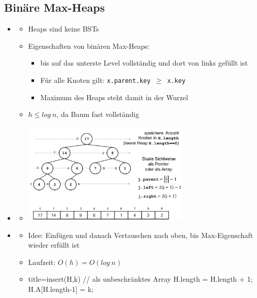 \documentclass[
    12pt,
    a4paper,
    ngerman,
    color=3b,%
    marginpar=false,
    colorback=false,
    leqno,
]{tudaexercise}
\begin{document}
    \subsection{Binäre Max-Heaps}\label{Binaere Max-Heaps}
    \begin{itemize}
        \item {}
            \begin{itemize}
                \item Heaps sind keine BSTs
                \item Eigenschaften von binären Max-Heaps:
                    \begin{itemize}
                        \item bis auf das unterste Level vollständig und dort von links gefüllt ist
                        \item Für alle Knoten gilt: \texttt{x.parent.key $\geq$ x.key}
                        \item Maximum des Heaps steht damit in der Wurzel
                    \end{itemize}
                \item $h \leq log~n$, da Baum fast vollständig
            \end{itemize}

        \item {}
            \begin{itemize}
                \item[] \includegraphics[width=8cm]{pictures/heapArr.PNG}
            \end{itemize}

        \item {}
            \begin{itemize}
                \item Idee: Einfügen und danach Vertauschen nach oben, bis Max-Eigenschaft wieder erfüllt ist
                \item Laufzeit: $O(h) = O(log~n)$
                \item[]
                    \begin{ccode}[autogobble]{title={insert(H,k) // als unbeschränktes Array}}
                    H.length = H.length + 1;
                    H.A[H.length-1] = k;


\end{ccode}
\end{itemize}
\end{itemize}
\end{document}
